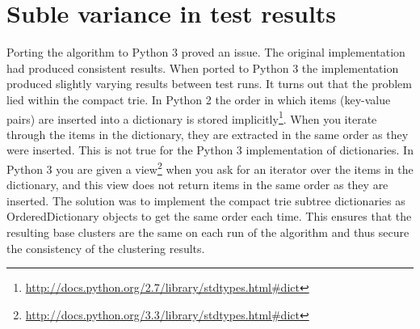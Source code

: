 

\section{Suble variance in test results}
Porting the \CTC algorithm to Python 3 proved an issue. The original \CTC implementation had produced consistent results. When ported to Python 3 the implementation produced slightly varying results between test runs. It turns out that the problem lied within the compact trie. In Python 2 the order in which items (key-value pairs) are inserted into a dictionary is stored implicitly\footnote{\url{http://docs.python.org/2.7/library/stdtypes.html\#dict}}. When you iterate through the items in the dictionary, they are extracted in the same order as they were inserted. This is not true for the Python 3 implementation of dictionaries. In Python 3 you are given a view\footnote{\url{http://docs.python.org/3.3/library/stdtypes.html\#dict}} when you ask for an iterator over the items in the dictionary, and this view does not return items in the same order as they are inserted. The solution was to implement the compact trie subtree dictionaries as OrderedDictionary objects to get the same order each time. This ensures that the resulting base clusters are the same on each run of the algorithm and thus secure the consistency of the clustering results.

